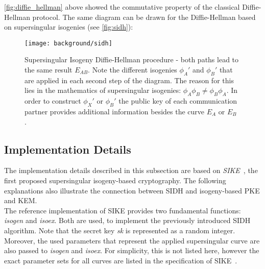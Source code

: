  \autoref{fig:diffie_hellman} above showed the commutative property of the classical Diffie-Hellman protocol. The same diagram can be drawn for the Diffie-Hellman based on supersingular isogenies (see \autoref{fig:sidh}):
\begin{figure}[H]
  \centering
  \texttt{[image: background/sidh]}
  \caption[Supersingular Isogeny Diffie-Hellman diagram]{Supersingular Isogeny Diffie-Hellman procedure - both paths lead to the same result $E_{AB}$. Note the different isogenies $\phi_{A}'$ and $\phi_{B}'$ that are applied in each second step of the diagram. The reason for this lies in the mathematics of supersingular isogenies: $\phi_{A} \phi_{B} \neq \phi_{B} \phi_{A}$. In order to construct $\phi_{X}'$ or $\phi_{B}'$ the public key of each communication partner provides additional information besides the curve $E_A$ or $E_B$.~\parencite{costello2016gentle}}
  \label{fig:sidh}
\end{figure}

\subsection{Implementation Details}\label{sec:sidh_implementation}

The implementation details described in this subsection are based on \textit{\gls{SIKE}}~\parencite{sike2020spec}, the first proposed supersingular isogeny-based cryptography. The following explanations also illustrate the connection between SIDH and isogeny-based \gls{PKE} and \gls{KEM}.\\
The reference implementation of \gls{SIKE} provides two fundamental functions: \textit{isogen} and \textit{isoex}. Both are used, to implement the previously introduced \gls{SIDH} algorithm. Note that the secret key \textit{sk} is represented as a random integer. Moreover, the used parameters that represent the applied supersingular curve are also passed to \textit{isogen} and \textit{isoex}. For simplicity, this is not listed here, however the exact parameter sets for all curves are listed in the specification of \gls{SIKE}~\parencite{sike2020spec}.

